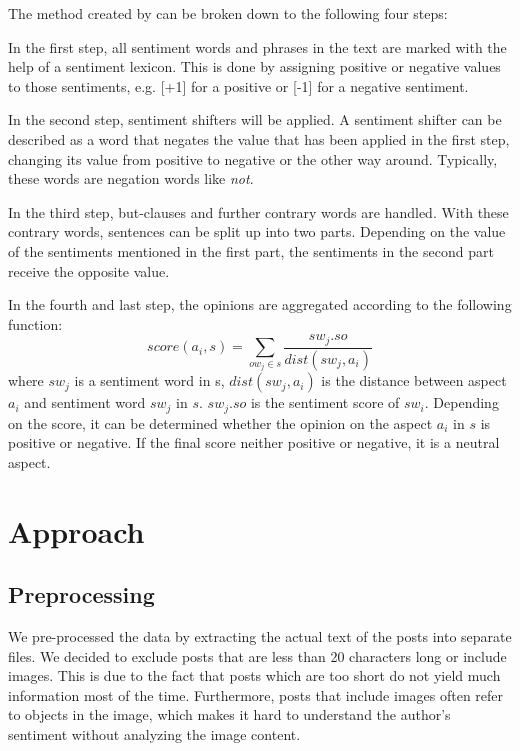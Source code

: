 \documentclass[10pt,a4paper]{article}
\begin{document}
		The method created by \cite{Ding:2008:HLA:1341531.1341561} can be broken down to the following four steps: 
		
		In the first step, all sentiment words and phrases in the text are marked with the help of a sentiment lexicon. This is done by assigning positive or negative values to those sentiments, e.g. [+1] for a positive or [-1] for a negative sentiment.
		
		In the second step, sentiment shifters will be applied. A sentiment shifter can be described as a word that negates the value that has been applied in the first step, changing its value from positive to negative or the other way around. Typically, these words are negation words like \textit{not}. 
		
		In the third step, but-clauses and further contrary words are handled. With these contrary words, sentences can be split up into two parts. Depending on the value of the sentiments mentioned in the first part, the sentiments in the second part receive the opposite value.
		
		In the fourth and last step, the opinions are aggregated according to the following function:
		\begin{displaymath}
			score(a_i,s) = \sum_{ow_j \in s} \frac{sw_j.so}{dist(sw_j,a_i)}
		\end{displaymath}
		where $sw_j$ is a sentiment word in s, $dist(sw_j, a_i)$ is the distance between aspect $a_i$ and sentiment word $sw_j$ in $s$. $sw_j.so$ is the sentiment score of $sw_i$.  Depending on the score, it can be determined whether the opinion on the aspect $a_i$ in $s$ is positive or negative. If the final score neither positive or negative, it is a neutral aspect.
	
	
	\section{Approach}

		\subsection{Preprocessing}
		We pre-processed the data by extracting the actual text of the posts into separate files. We decided to exclude posts that are less than 20 characters long or include images. This is due to the fact that posts which are too short do not yield much information most of the time. Furthermore, posts that include images often refer to objects in the image, which makes it hard to understand the author's sentiment without analyzing the image content.
	
\end{document}
